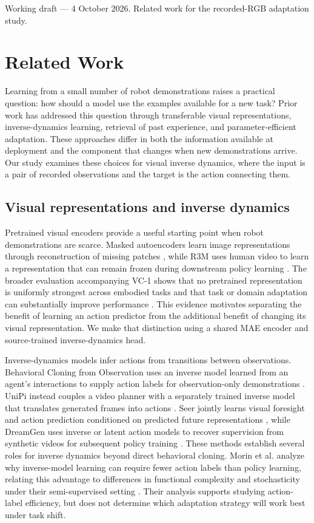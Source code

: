 \documentclass[11pt]{article}
\begin{document}
{\small Working draft --- 4 October 2026. Related work for the recorded-RGB adaptation study.}

\section*{Related Work}

Learning from a small number of robot demonstrations raises a practical question: how should a model use the examples available for a new task? Prior work has addressed this question through transferable visual representations, inverse-dynamics learning, retrieval of past experience, and parameter-efficient adaptation. These approaches differ in both the information available at deployment and the component that changes when new demonstrations arrive. Our study examines these choices for visual inverse dynamics, where the input is a pair of recorded observations and the target is the action connecting them.

\subsection*{Visual representations and inverse dynamics}

Pretrained visual encoders provide a useful starting point when robot demonstrations are scarce. Masked autoencoders learn image representations through reconstruction of missing patches \cite{mae}, while R3M uses human video to learn a representation that can remain frozen during downstream policy learning \cite{r3m}. The broader evaluation accompanying VC-1 shows that no pretrained representation is uniformly strongest across embodied tasks and that task or domain adaptation can substantially improve performance \cite{vc1}. This evidence motivates separating the benefit of learning an action predictor from the additional benefit of changing its visual representation. We make that distinction using a shared MAE encoder and source-trained inverse-dynamics head.

Inverse-dynamics models infer actions from transitions between observations. Behavioral Cloning from Observation uses an inverse model learned from an agent's interactions to supply action labels for observation-only demonstrations \cite{bco}. UniPi instead couples a video planner with a separately trained inverse model that translates generated frames into actions \cite{unipi}. Seer jointly learns visual foresight and action prediction conditioned on predicted future representations \cite{seer}, while DreamGen uses inverse or latent action models to recover supervision from synthetic videos for subsequent policy training \cite{dreamgen}. These methods establish several roles for inverse dynamics beyond direct behavioral cloning. Morin et al. analyze why inverse-model learning can require fewer action labels than policy learning, relating this advantage to differences in functional complexity and stochasticity under their semi-supervised setting \cite{morin}. Their analysis supports studying action-label efficiency, but does not determine which adaptation strategy will work best under task shift.
\end{document}
